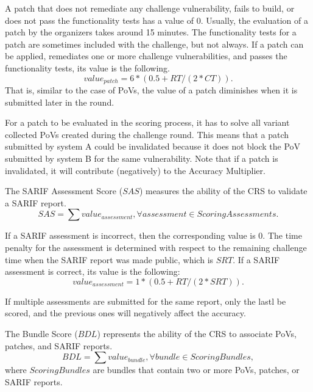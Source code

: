 A patch that does not remediate any challenge vulnerability,  fails to build, or does not pass the functionality tests has a value of 0.
Usually, the evaluation of a patch by the organizers takes around 15 minutes.
The functionality tests for a patch are sometimes included with the challenge, but not always.
If a patch can be applied, remediates one or more challenge vulnerabilities, and passes the functionality tests, its value is the following.
\begin{equation}
value_{patch} = 6 * (0.5 + RT/(2*CT)).
\end{equation}
That is, similar to the case of PoVs, the value of a patch diminishes when it is submitted later in the round.

For a patch to be evaluated in the scoring process, it has to solve all variant collected PoVs created during the challenge round. 
This means that a patch submitted by system A could be invalidated because it does not block the PoV submitted by system B for the same vulnerability.
Note that if a patch is invalidated, it will contribute (negatively) to the Accuracy Multiplier.

The SARIF Assessment Score ($SAS$) measures the ability of the CRS to validate a SARIF report.
\begin{equation}
SAS = \sum value_{assessment}, \forall assessment \in ScoringAssessments.
\end{equation}

If a SARIF assessment is incorrect, then the corresponding value is 0.
The time penalty for the assessment is determined with respect to the remaining challenge time when the SARIF report was made public, which is $SRT$. 
If a SARIF assessment is correct, its value is the following:
\begin{equation}
value_{assessment} = 1 * (0.5 + RT/(2*SRT)).
\end{equation}

If multiple assessments are submitted for the same report, only the lastl be scored, and the previous ones will negatively affect the accuracy.

The Bundle Score ($BDL$) represents the ability of the CRS to associate PoVs, patches, and SARIF reports.
\begin{equation}
BDL = \sum value_{bundle}, \forall bundle \in ScoringBundles,
\end{equation}
where $ScoringBundles$ are bundles that contain two or more PoVs, patches, or SARIF reports.

